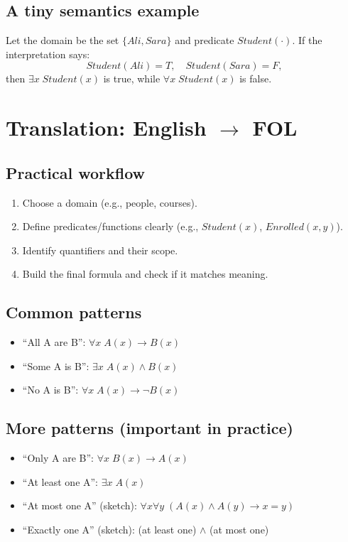 \documentclass[11pt]{article}
\begin{document}
\subsection{A tiny semantics example}
Let the domain be the set $\{Ali, Sara\}$ and predicate $Student(\cdot)$.
If the interpretation says:
\[
  Student(Ali)=T,\quad Student(Sara)=F,
\]
then $\exists x\; Student(x)$ is true, while $\forall x\; Student(x)$ is false.

\section{Translation: English $\rightarrow$ FOL}
\subsection{Practical workflow}
\begin{enumerate}[leftmargin=*]
  \item Choose a domain (e.g., people, courses).
  \item Define predicates/functions clearly (e.g., $Student(x)$, $Enrolled(x,y)$).
  \item Identify quantifiers and their scope.
  \item Build the final formula and check if it matches meaning.
\end{enumerate}

\subsection{Common patterns}
\begin{itemize}[leftmargin=*]
  \item ``All A are B'': $\forall x\; A(x) \rightarrow B(x)$
  \item ``Some A is B'': $\exists x\; A(x) \land B(x)$
  \item ``No A is B'': $\forall x\; A(x) \rightarrow \lnot B(x)$
\end{itemize}

\subsection{More patterns (important in practice)}
\begin{itemize}[leftmargin=*]
  \item ``Only A are B'': $\forall x\; B(x) \rightarrow A(x)$
  \item ``At least one A'': $\exists x\; A(x)$
  \item ``At most one A'' (sketch): $\forall x\forall y\; (A(x)\land A(y) \rightarrow x=y)$
  \item ``Exactly one A'' (sketch): (at least one) $\land$ (at most one)
\end{itemize}
\end{document}
